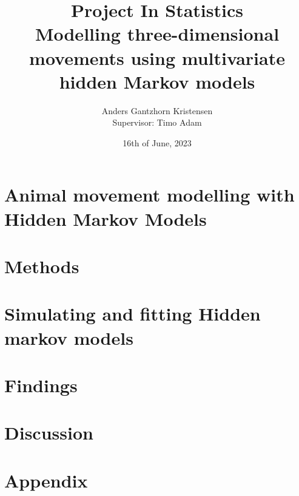 \documentclass[11pt]{article}
\begin{document}
\pagestyle{fancy}
\fancyfoot{}
\fancyfoot[C]{\thepage}
\renewcommand{\headrulewidth}{0pt}
\renewcommand{\footrulewidth}{0pt}
\allowdisplaybreaks



\title{\vspace{-4cm}Project In Statistics\\
Modelling three-dimensional movements using
multivariate hidden Markov models}
\author{Anders Gantzhorn Kristensen\\
Supervisor: Timo Adam}
\date{16th of June, 2023}
\maketitle
\section{Animal movement modelling with Hidden Markov Models}\label{intro}

\newpage
\section{Methods}\label{Methods}

\newpage
\section{Simulating and fitting Hidden markov models}\label{Simulation}

\newpage
\section{Findings}\label{Application}

\newpage
\section{Discussion}\label{Discussion}

\newpage

\newpage
\appendix
\section*{Appendix}

\end{document}
